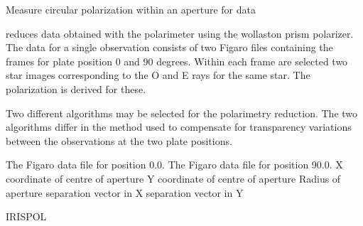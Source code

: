 \begin{manroutinedescription}
        Measure circular polarization within an aperture for {} data

        {} reduces data obtained with the {} {} polarimeter
        using the wollaston  prism polarizer. The data for a
        single observation consists of two Figaro files containing the
        frames for plate position 0 and 90 degrees. Within each
        frame are selected two star images corresponding to the O and E rays
        for the same star. The polarization is derived for these.

        Two different algorithms may be selected for the polarimetry
        reduction. The two algorithms differ in the method used to
        compensate for transparency variations between the observations
        at the two plate positions.


\begin{manparametertable}
     The Figaro data file for %
position 0.0.
     The Figaro data file for %
position 90.0.
  X coordinate of centre of aperture
  Y coordinate of centre of aperture
     Radius of aperture
  {} separation vector %
in X
  {} separation vector %
in Y

\end{manparametertable}
\end{manroutinedescription}
%
{IRISPOL}
